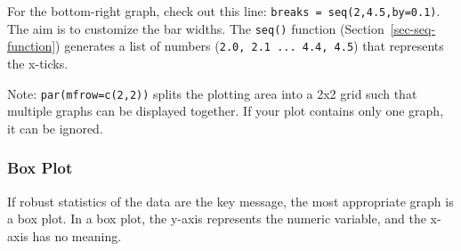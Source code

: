 \documentclass[
  letterpaper,
  DIV=11,
  numbers=noendperiod]{scrreprt}
\newenvironment{Shaded}{\begin{snugshade}}{\end{snugshade}}
\newcommand{\AttributeTok}[1]{\textcolor[rgb]{0.40,0.45,0.13}{#1}}
\newcommand{\CommentTok}[1]{\textcolor[rgb]{0.37,0.37,0.37}{#1}}
\newcommand{\ConstantTok}[1]{\textcolor[rgb]{0.56,0.35,0.01}{#1}}
\newcommand{\DecValTok}[1]{\textcolor[rgb]{0.68,0.00,0.00}{#1}}
\newcommand{\FunctionTok}[1]{\textcolor[rgb]{0.28,0.35,0.67}{#1}}
\newcommand{\NormalTok}[1]{\textcolor[rgb]{0.00,0.23,0.31}{#1}}
\newcommand{\SpecialCharTok}[1]{\textcolor[rgb]{0.37,0.37,0.37}{#1}}
\newcommand{\StringTok}[1]{\textcolor[rgb]{0.13,0.47,0.30}{#1}}
\begin{document}
For the bottom-right graph, check out this line:
\texttt{breaks\ =\ seq(2,4.5,by=0.1)}. The aim is to customize the bar
widths. The \texttt{seq()} function (Section~\ref{sec-seq-function})
generates a list of numbers (\texttt{2.0,\ 2.1\ ...\ 4.4,\ 4.5}) that
represents the x-ticks.

Note: \texttt{par(mfrow=c(2,2))} splits the plotting area into a 2x2
grid such that multiple graphs can be displayed together. If your plot
contains only one graph, it can be ignored.

\subsubsection{Box Plot}\label{box-plot}

If robust statistics of the data are the key message, the most
appropriate graph is a box plot. In a box plot, the y-axis represents
the numeric variable, and the x-axis has no meaning.

\begin{Shaded}
\end{Shaded}
\end{document}
